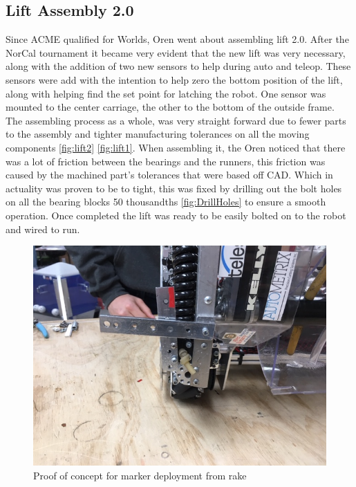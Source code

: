 \documentclass{article}
\begin{document}
\subsection{Lift Assembly 2.0}
Since ACME qualified for Worlds, Oren went about assembling lift 2.0. After the NorCal tournament it became very evident that the new lift was very necessary, along with the addition of two new sensors to help during auto and teleop. These sensors were add with the intention to help zero the bottom position of the lift, along with helping find the set point for latching the robot. One sensor was mounted to the center carriage, the other to the bottom of the outside frame. The assembling process as a whole, was very straight forward due to fewer parts to the assembly and tighter manufacturing tolerances on all the moving components \ref{fig:lift2} \ref{fig:lift1}. When assembling it, the Oren noticed that there was a lot of friction between the bearings and the runners, this friction was caused by the machined part's tolerances that were based off CAD. Which in actuality was proven to be to tight, this was fixed by drilling out the bolt holes on all the bearing blocks 50 thousandths \ref{fig:DrillHoles} to ensure a smooth operation. Once completed the lift was ready to be easily bolted on to the robot and wired to run.         

\begin{figure}
    \centering
    \includegraphics[width= 0.5 \textwidth]{27_03-04/images/rakemarker.JPG}
    \caption{Proof of concept for marker deployment from rake}
    \label{fig:Rake marker proof of concept}
\end{figure}
\end{document}
